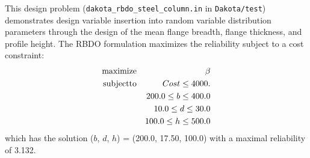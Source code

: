 This design problem (\texttt{dakota\_rbdo\_steel\_column.in} in
\texttt{Dakota/test}) demonstrates design variable insertion into
random variable distribution parameters through the design of the mean
flange breadth, flange thickness, and profile height. The RBDO
formulation maximizes the reliability subject to a cost constraint:
\begin{eqnarray}
{\rm maximize }   & & \beta                   \nonumber \\
{\rm subject to } & & Cost  \leq 4000.       \nonumber \\
                  & & 200.0 \leq b \leq 400.0 \\
                  & &  10.0 \leq d \leq  30.0 \nonumber \\
                  & & 100.0 \leq h \leq 500.0 \nonumber
\end{eqnarray}
which has the solution ($b$, $d$, $h$) = (200.0, 17.50, 100.0) with a
maximal reliability of 3.132.

